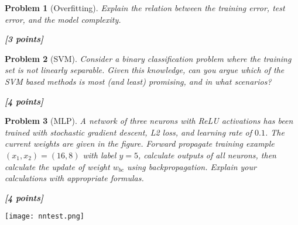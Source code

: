 \documentclass[11pt]{article}
\newtheorem{problem}{Problem}
\newcommand{\point}[1]{\hfill {\bf [#1 points]}}
\newif\ifsolutions
\newcommand{\solution}[1]{
\ifsolutions
\smallskip
\par
\noindent\emph{Solution: } #1
\fi
}
\begin{document}
\begin{problem}[Overfitting]\em
Explain the relation between the training error, test error, and the model complexity. 

\point{3}
\solution{
While training error always decreases as model complexity increases, test error behaves differently. When model complexity is relatively low, test error will decrease just like training error, but only up to a certain point. From then on test error will start increasing if the model complexity keeps increasing. When the complexity goes too high, it results in what is called overfitting, where the model performs very well in training data but has terrible performance in test data. In other words, the in-sample error poorly tracks the out-sample error, which is undesirable. In the other case which is called underfitting, the model complexity is too low that it performs badly in both training and test data.
}
\end{problem}


\begin{problem} [SVM]\em
Consider a binary classification problem where the training set is not linearly separable. Given this knowledge, can you argue which of the SVM based methods is most (and least) promising, and in what scenarios? 

\point{4} 
\solution{
[Present your solution here...]

}
\end{problem}


\hspace{-0.041\textwidth}
\begin{minipage}{0.55\textwidth}
\begin{problem}[MLP] \em
A network of three neurons with  ReLU activations has been trained with stochastic gradient descent, L2 loss, and learning rate of $0.1$.  The current weights are given in the figure. Forward propagate  training example $(x_1,x_2)=(16,8)$ with label $y=5$, calculate outputs of  all neurons, then  calculate  the update of weight $w_{bc}$ using backpropagation. Explain your calculations with appropriate formulas. 

\point{4}
\end{problem}
\end{minipage}  
\hspace{0.09\textwidth}
\begin{minipage}{0.4\textwidth}
  \texttt{[image: nntest.png]} 
\end{minipage}  
\end{document}
